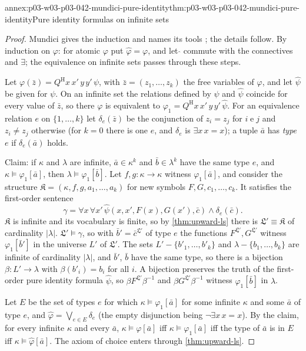 \begin{annexitem}{annex:p03-w03-p03-042-mundici-pure-identity}{thm:p03-w03-p03-042-mundici-pure-identity}{Pure identity formulas on infinite sets}
\begin{proof}
Mundici gives the induction and names its tools
\cite[p.~216]{Mundici1985OtherQuantifiers}; the details follow.  By
induction on \(\varphi\): for atomic \(\varphi\) put
\(\hat\varphi=\varphi\), and let \(\hat{}\) commute with the connectives
and \(\exists\); the equivalence on infinite sets passes through these
steps.

Let \(\varphi(\bar z)=Q^{\mathrm H}x\,x'\,y\,y'\,\psi\), with
\(\bar z=(z_1,\ldots,z_k)\) the free variables of \(\varphi\), and let
\(\hat\psi\) be given for \(\psi\).  On an infinite set the
relations defined by \(\psi\) and \(\hat\psi\) coincide for every value of
\(\bar z\), so there \(\varphi\) is equivalent to \(\varphi_1=Q^{\mathrm
H}x\,x'\,y\,y'\,\hat\psi\).  For an equivalence relation \(e\) on
\(\{1,\ldots,k\}\) let \(\delta_e(\bar z)\) be the conjunction of
\(z_i=z_j\) for \(i\mathrel ej\) and \(z_i\neq z_j\) otherwise (for
\(k=0\) there is one \(e\), and \(\delta_e\) is \(\exists x\,x=x\)); a
tuple \(\bar a\) has \emph{type} \(e\) if \(\delta_e(\bar a)\) holds.

Claim: if \(\kappa\) and \(\lambda\) are infinite, \(\bar a\in\kappa^k\)
and \(\bar b\in\lambda^k\) have the same type \(e\), and
\(\kappa\models\varphi_1[\bar a]\), then \(\lambda\models\varphi_1[\bar
b]\).  Let \(f,g:\kappa\to\kappa\) witness \(\varphi_1[\bar a]\), and
consider the structure \(\mathfrak K=(\kappa,f,g,a_1,\ldots,a_k)\) for
new symbols \(F,G,c_1,\ldots,c_k\).  It satisfies the first-order sentence
\[
 \gamma=\forall x\,\forall x'\,\hat\psi(x,x',F(x),G(x'),\bar c)\wedge
 \delta_e(\bar c).
\]
\(\mathfrak K\) is infinite and its vocabulary is finite, so by
\cref{thm:upward-ls} there is \(\mathfrak L'\equiv\mathfrak K\) of
cardinality \(|\lambda|\).  \(\mathfrak L'\models\gamma\), so with
\(\bar b'=\bar c^{\mathfrak L'}\) of type \(e\) the functions
\(F^{\mathfrak L'},G^{\mathfrak L'}\) witness \(\varphi_1[\bar b']\) in the
universe \(L'\) of \(\mathfrak L'\).  The sets \(L'-\{b'_1,\ldots,b'_k\}\)
and \(\lambda-\{b_1,\ldots,b_k\}\) are infinite of cardinality
\(|\lambda|\), and \(\bar b'\), \(\bar b\) have the same type, so there is
a bijection \(\beta:L'\to\lambda\) with \(\beta(b'_i)=b_i\) for all \(i\).
A bijection preserves the truth of the first-order pure identity formula
\(\hat\psi\), so \(\beta F^{\mathfrak L'}\beta^{-1}\) and \(\beta
G^{\mathfrak L'}\beta^{-1}\) witness \(\varphi_1[\bar b]\) in \(\lambda\).

Let \(E\) be the set of types \(e\) for which \(\kappa\models\varphi_1[\bar
a]\) for some infinite \(\kappa\) and some \(\bar a\) of type \(e\), and
\(\hat\varphi=\bigvee_{e\in E}\delta_e\) (the empty disjunction being
\(\neg\exists x\,x=x\)).  By the claim, for every infinite \(\kappa\) and
every \(\bar a\), \(\kappa\models\varphi[\bar a]\) iff
\(\kappa\models\varphi_1[\bar a]\) iff the type of \(\bar a\) is in \(E\)
iff \(\kappa\models\hat\varphi[\bar a]\).  The axiom of choice enters
through \cref{thm:upward-ls}.
\end{proof}
\end{annexitem}

